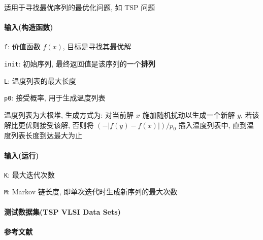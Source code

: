 适用于寻找最优序列的最优化问题, 如 TSP 问题

\paragraph{输入(构造函数)}

\verb|f|: 价值函数 \(f(x)\), 目标是寻找其最优解

\verb|init|: 初始序列, 最终返回值是该序列的一个\textbf{排列}

\verb|L|: 温度列表的最大长度

\verb|p0|: 接受概率, 用于生成温度列表

温度列表为大根堆, 生成方式为: 对当前解 \(x\) 施加随机扰动以生成一个新解 \(y\), 若该解比更优则接受该解, 否则将 \((-|f(y)-f(x)|)/p_0\) 插入温度列表中, 直到温度列表长度到达最大为止

\paragraph{输入(运行)}

\verb|K|: 最大迭代次数

\verb|M|: Markov 链长度, 即单次迭代时生成新序列的最大次数

\paragraph{测试数据集(TSP VLSI Data Sets)} \cite{tspvlsidatasets}

\paragraph{参考文献} \cite{zhan2016list}
